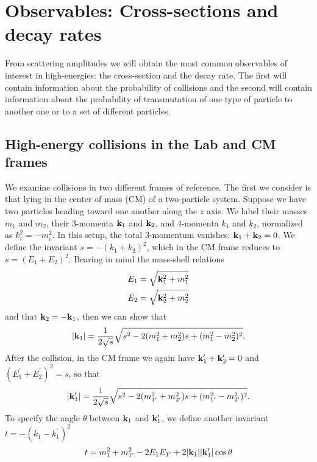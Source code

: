 \chapter{Observables: Cross-sections and decay rates}
From scattering amplitudes we will obtain the most common observables of interest in high-energies: the cross-section and the decay rate. The first will contain information about the probability of collisions and the second will contain information about the probability of transmutation of one type of particle to another one or to a set of different particles.
\section{High-energy collisions in the Lab and CM frames}
We examine collisions in two different frames of reference. The first we consider is that lying in the center of mass (CM) of a two-particle system. Suppose we have two particles heading toward one another along the $z$ axis. We label their masses $m_1$ and $m_2$, their 3-momenta $\vb{k}_1$ and $\vb{k}_2$, and 4-momenta $k_1$ and $k_2$, normalized as $k_i^2=-m^2_i$. In this setup, the total 3-momentum vanishes: $\vb{k}_1+\vb{k}_2=0$. We define the invariant $s=-(k_1+k_2)^2$, which in the CM frame reduces to $s=(E_1+E_2)^2$. Bearing in mind the mass-shell relations
\begin{equation}
    \begin{aligned}
        E_1&=\sqrt{\vb{k}_1^2+m_1^2}\\
        E_2&=\sqrt{\vb{k}_2^2+m_2^2}
    \end{aligned}
\end{equation}
and that $\vb{k}_2=-\vb{k}_1$, then we can show that
\begin{equation}
    \abs{\vb{k}_1}=\frac{1}{2\sqrt{s}}\sqrt{s^2-2(m_1^2+m_2^2)s+(m_1^2-m_2^2)^2}.
    \label{k1}
\end{equation}
After the collision, in the CM frame we again have $\vb{k}_1^\prime+\vb{k}_2^\prime=0$ and $(E_1^\prime+E_2^\prime)^2=s$, so that
\begin{equation}
    \abs{\vb{k}_1^\prime}=\frac{1}{2\sqrt{s}}\sqrt{s^2-2(m_{1^\prime}^2+m_{2^\prime}^2)s+(m_{1^\prime}^2-m_{2^\prime}^2)^2}.
    \label{k1linha}
\end{equation}
To specify the angle $\theta$ between $\vb{k}_1$ and $\vb{k}_1^\prime$, we define another invariant $t=-(k_1-k_1^\prime)^2$
\begin{equation}
    t=m_1^2+m_{1^\prime}^2-2E_1E_{1^\prime}+2\abs{\vb{k}_1}\abs{\vb{k}_{1}^\prime}\cos\theta
    \label{tzinho}
\end{equation}
